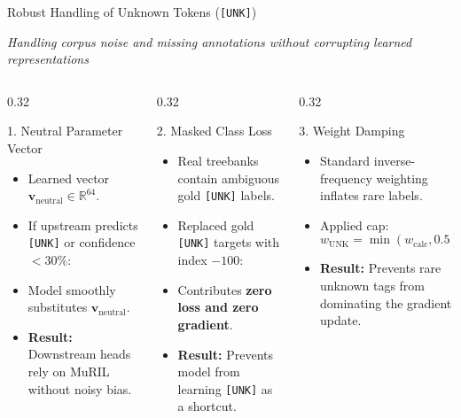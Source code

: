 \documentclass[aspectratio=169, 10pt]{beamer}
\begin{document}
\begin{frame}{Robust Handling of Unknown Tokens (\texttt{[UNK]})}
  \begin{center}
    \small \textit{Handling corpus noise and missing annotations without corrupting learned representations}
  \end{center}

  \begin{columns}[T]
    \begin{column}{0.32\textwidth}
      \begin{block}{1. Neutral Parameter Vector}
        \begin{itemize}
          \item Learned vector $\mathbf{v}_{\text{neutral}} \in \mathbb{R}^{64}$.
          \item If upstream predicts \texttt{[UNK]} or confidence $< 30\%$:
          \item Model smoothly substitutes $\mathbf{v}_{\text{neutral}}$.
          \item \textbf{Result:} Downstream heads rely on MuRIL without noisy bias.
        \end{itemize}
      \end{block}
    \end{column}

    \begin{column}{0.32\textwidth}
      \begin{block}{2. Masked Class Loss}
        \begin{itemize}
          \item Real treebanks contain ambiguous gold \texttt{[UNK]} labels.
          \item Replaced gold \texttt{[UNK]} targets with index $-100$:
          \item Contributes \textbf{zero loss and zero gradient}.
          \item \textbf{Result:} Prevents model from learning \texttt{[UNK]} as a shortcut.
        \end{itemize}
      \end{block}
    \end{column}

    \begin{column}{0.32\textwidth}
      \begin{block}{3. Weight Damping}
        \begin{itemize}
          \item Standard inverse-frequency weighting inflates rare labels.
          \item Applied cap:
          \[
            w_{\text{UNK}} = \min(w_{\text{calc}}, 0.5)
          \]
          \item \textbf{Result:} Prevents rare unknown tags from dominating the gradient update.
        \end{itemize}
      \end{block}
    \end{column}
  \end{columns}
\end{frame}
\end{document}
